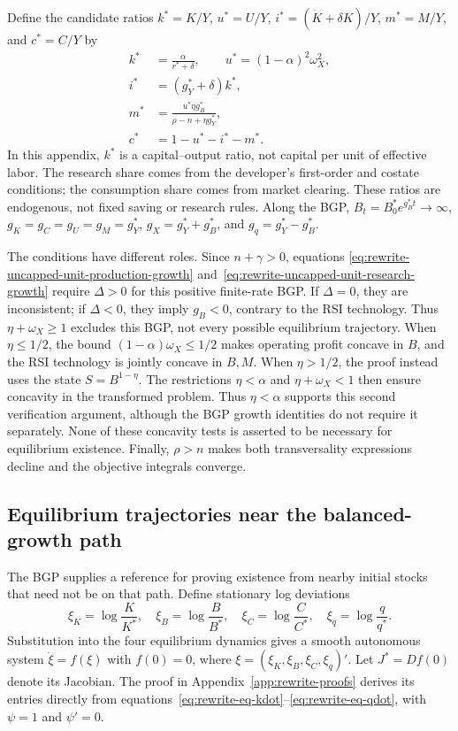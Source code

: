 Define the candidate ratios $k^*=K/Y$, $u^*=U/Y$,
$i^*=(\dot K+\delta K)/Y$, $m^*=M/Y$, and $c^*=C/Y$ by
\begin{align}
 k^*&=\frac{\alpha}{r^*+\delta},\qquad u^*=(1-\alpha)^2\omega_X^2,
 \label{eq:rewrite-uncapped-unit-capital-inference}\\
 i^*&=(g_Y^*+\delta)k^*,
 \label{eq:rewrite-uncapped-unit-investment}\\
 m^*&=\frac{u^*\eta g_B^*}{\rho-n+\eta g_Y^*},
 \label{eq:rewrite-uncapped-unit-research-share}\\
 c^*&=1-u^*-i^*-m^*.
 \label{eq:rewrite-uncapped-unit-consumption}
\end{align}
In this appendix, $k^*$ is a capital--output ratio, not capital per unit of
effective labor. The research share comes from the developer's first-order
and costate conditions; the consumption share comes from market clearing.
These ratios are endogenous, not fixed saving or research rules.
Along the BGP, $B_t=B_0^*e^{g_B^*t}\to\infty$,
$g_K=g_C=g_U=g_M=g_Y^*$, $g_X=g_Y^*+g_B^*$, and $g_q=g_Y^*-g_B^*$.

The conditions have different roles. Since $n+\gamma>0$, equations
\eqref{eq:rewrite-uncapped-unit-production-growth}
and~\eqref{eq:rewrite-uncapped-unit-research-growth} require $\Delta>0$ for
this positive finite-rate BGP. If $\Delta=0$, they are inconsistent; if
$\Delta<0$, they imply $g_B<0$, contrary to the RSI technology. Thus
$\eta+\omega_X\geq1$ excludes this BGP, not every possible equilibrium
trajectory. When $\eta\leq1/2$, the bound $(1-\alpha)\omega_X\leq1/2$
makes operating profit concave in $B$, and the RSI technology is jointly
concave in $B,M$. When $\eta>1/2$, the proof instead uses the state
$S=B^{1-\eta}$. The restrictions $\eta<\alpha$ and $\eta+\omega_X<1$
then ensure concavity in the transformed problem. Thus $\eta<\alpha$
supports this second verification argument, although the BGP growth
identities do not require it separately. None of these concavity tests is
asserted to be necessary for equilibrium existence. Finally, $\rho>n$ makes both
transversality expressions decline and the objective integrals converge.

\subsection{Equilibrium trajectories near the balanced-growth path}

The BGP supplies a reference for proving existence from nearby initial
stocks that need not be on that path. Define stationary log deviations
\begin{equation}
 \xi_K=\log\frac K{K^*},\quad
 \xi_B=\log\frac B{B^*},\quad
 \xi_C=\log\frac C{C^*},\quad
 \xi_q=\log\frac q{q^*}.
 \label{eq:rewrite-uncapped-unit-deviations}
\end{equation}
Substitution into the four equilibrium dynamics gives a smooth autonomous
system $\dot\xi=f(\xi)$ with $f(0)=0$, where
$\xi=(\xi_K,\xi_B,\xi_C,\xi_q)'$. Let $J^*=Df(0)$ denote its Jacobian.
The proof in Appendix~\ref{app:rewrite-proofs} derives its entries directly from
equations~\eqref{eq:rewrite-eq-kdot}--\eqref{eq:rewrite-eq-qdot}, with
$\psi=1$ and $\psi'=0$.

